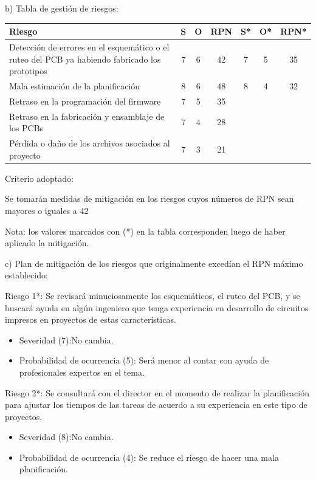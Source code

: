 \documentclass[
11pt, %
codirector, %
]{charter}
\begin{document}
b) Tabla de gestión de riesgos: 

\begin{table}[htpb]
\centering
\begin{tabularx}{\linewidth}{@{}|X|c|c|c|c|c|c|@{}}
\hline
\rowcolor[HTML]{C0C0C0} 
Riesgo & S & O & RPN & S* & O* & RPN* \\ \hline
Detección de errores en el esquemático o el ruteo del PCB ya habiendo fabricado los prototipos&   7&   6&     42&    7&    5&      35\\ \hline
Mala estimación de la planificación      &   8&   6&     48&    8&    4&      32\\ \hline
Retraso en la programación del firmware       &   7&   5&     35&    &    &      \\ \hline
Retraso en la fabricación y ensamblaje de los PCBs       &   7&   4&     28&    &    &      \\ \hline
Pérdida o daño de los archivos asociados al proyecto      &   7&   3&     21&    &    &      \\ \hline
\end{tabularx}%
\end{table}

Criterio adoptado: 

Se tomarán medidas de mitigación en los riesgos cuyos números de RPN sean mayores o iguales a 42

Nota: los valores marcados con (*) en la tabla corresponden luego de haber aplicado la mitigación.

c) Plan de mitigación de los riesgos que originalmente excedían el RPN máximo establecido:
 
Riesgo 1*:  Se revisará minuciosamente los esquemáticos, el ruteo del PCB, y se buscará ayuda en algún ingeniero que tenga experiencia en desarrollo de circuitos impresos en proyectos de estas características.
  \begin{itemize}
	\item Severidad (7):No cambia.
	\item Probabilidad de ocurrencia (5): Será menor al contar con ayuda de profesionales expertos en el tema.
\end{itemize}

Riesgo 2*: Se consultará con el director en el momento de realizar la planificación para ajustar los tiempos de las tareas de acuerdo a su experiencia en este tipo de proyectos.
  \begin{itemize}
	\item Severidad (8):No cambia.
	\item Probabilidad de ocurrencia (4): Se reduce el riesgo de hacer una mala planificación.
\end{itemize}
\end{document}
